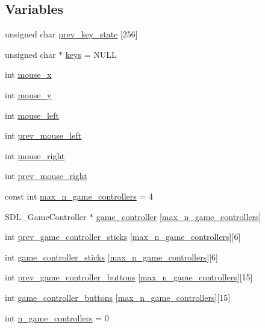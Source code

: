 \subsection*{Variables}
\begin{DoxyCompactItemize}
\item 
unsigned char \mbox{\hyperlink{namespace_input_ac3ca2dfa8b993f9c922fd9d124bd480d}{prev\+\_\+key\+\_\+state}} \mbox{[}256\mbox{]}
\item 
unsigned char $\ast$ \mbox{\hyperlink{namespace_input_addbf18576980ba9c1970d40a3d56d3db}{keys}} = N\+U\+LL
\item 
int \mbox{\hyperlink{namespace_input_a13f7e6bed06c4dbea336749424249445}{mouse\+\_\+x}}
\item 
int \mbox{\hyperlink{namespace_input_afd2e8c17cd14d860c965064b5d8eb347}{mouse\+\_\+y}}
\item 
int \mbox{\hyperlink{namespace_input_ac77b04de283e90e2d9ae90e7eae1cc64}{mouse\+\_\+left}}
\item 
int \mbox{\hyperlink{namespace_input_a98e412d998852e9da72cf0d9b56e3484}{prev\+\_\+mouse\+\_\+left}}
\item 
int \mbox{\hyperlink{namespace_input_a8a8bcd31d8a993110521e4027a666c16}{mouse\+\_\+right}}
\item 
int \mbox{\hyperlink{namespace_input_a0187116f9da032de7bf1b7d15950426d}{prev\+\_\+mouse\+\_\+right}}
\item 
const int \mbox{\hyperlink{namespace_input_a9fd846153f42bd341dabd1a5764284be}{max\+\_\+n\+\_\+game\+\_\+controllers}} = 4
\item 
S\+D\+L\+\_\+\+Game\+Controller $\ast$ \mbox{\hyperlink{namespace_input_a97726c05e4bc2d633c725272ac33828e}{game\+\_\+controller}} \mbox{[}\mbox{\hyperlink{namespace_input_a9fd846153f42bd341dabd1a5764284be}{max\+\_\+n\+\_\+game\+\_\+controllers}}\mbox{]}
\item 
int \mbox{\hyperlink{namespace_input_a8e9c2bacc51ca6aecc90a6ac0c95eb02}{prev\+\_\+game\+\_\+controller\+\_\+sticks}} \mbox{[}\mbox{\hyperlink{namespace_input_a9fd846153f42bd341dabd1a5764284be}{max\+\_\+n\+\_\+game\+\_\+controllers}}\mbox{]}\mbox{[}6\mbox{]}
\item 
int \mbox{\hyperlink{namespace_input_aea08108c1d4e370b0de73970baf87430}{game\+\_\+controller\+\_\+sticks}} \mbox{[}\mbox{\hyperlink{namespace_input_a9fd846153f42bd341dabd1a5764284be}{max\+\_\+n\+\_\+game\+\_\+controllers}}\mbox{]}\mbox{[}6\mbox{]}
\item 
int \mbox{\hyperlink{namespace_input_a7468efcaeedc102da41a91701518349a}{prev\+\_\+game\+\_\+controller\+\_\+buttons}} \mbox{[}\mbox{\hyperlink{namespace_input_a9fd846153f42bd341dabd1a5764284be}{max\+\_\+n\+\_\+game\+\_\+controllers}}\mbox{]}\mbox{[}15\mbox{]}
\item 
int \mbox{\hyperlink{namespace_input_a61ef1ee2bd1ce6464348ff388e221203}{game\+\_\+controller\+\_\+buttons}} \mbox{[}\mbox{\hyperlink{namespace_input_a9fd846153f42bd341dabd1a5764284be}{max\+\_\+n\+\_\+game\+\_\+controllers}}\mbox{]}\mbox{[}15\mbox{]}
\item 
int \mbox{\hyperlink{namespace_input_aaa49f06b0ca68c6521842cbbf673567d}{n\+\_\+game\+\_\+controllers}} = 0
\end{DoxyCompactItemize}


